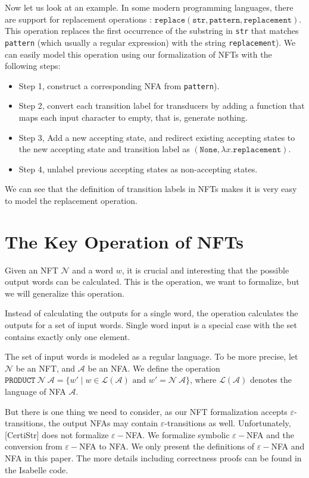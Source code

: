 \documentclass[a4paper,UKenglish,cleveref, autoref, thm-restate]{lipics-v2021}
\begin{document}
Now let us look at an example. In some modern programming languages, there are support for replacement operations : $\texttt{replace}(\texttt{str}, \texttt{pattern}, \texttt{replacement})$. This operation replaces the first occurrence of the substring  in \texttt{str} that matches \texttt{pattern} (which usually a regular expression) with the string \texttt{replacement}). 
We can easily model this operation using our formalization of NFTs with the following steps:
\begin{itemize}
\item Step 1, construct a corresponding NFA from \texttt{pattern}).
\item Step 2, convert each transition label for transducers by adding a function that maps each input character to empty, that is, generate nothing.
\item Step 3, Add a new accepting state, and redirect existing accepting states to the new accepting state and transition label as $(\texttt{None}, \lambda x. \texttt{replacement})$.
\item Step 4, unlabel previous accepting states as non-accepting states. 
\end{itemize}

We can see that the definition of transition labels in NFTs makes it is very easy to model the replacement operation.

\section{The Key Operation of NFTs}
\label{sec-form-fts}

Given an NFT $\mathcal{N}$ and a word $w$, it is crucial and interesting that the possible output words can be calculated. This is the operation, we want to formalize, but we will generalize this operation.

Instead of calculating the outputs for a single word, the operation calculates the outputs for a set of input words. Single word input is a special case with the set contains exactly only one element.

The set of input words is modeled as a regular language. To be more precise, let $\mathcal{N}$ be an NFT, and $\mathcal{A}$ be an NFA. We define the operation $\texttt{PRODUCT} ~\mathcal{N}~\mathcal{A} = \{w'\mid w\in \mathcal{L}(\mathcal{A})\text{ and } w' = \mathcal{N}~\mathcal{A}\}$, where $\mathcal{L}(\mathcal{A})$ denotes the language of NFA $\mathcal{A}$.


But there is one thing we need to consider, as our NFT formalization accepts $\varepsilon$-transitions, the output NFAs may contain $\varepsilon$-transitions as well. Unfortunately, [CertiStr] does not formalize $\varepsilon-$NFA. We formalize symbolic $\varepsilon-$NFA and the conversion from $\varepsilon-$NFA to NFA. We only present the definitions of $\varepsilon-$NFA and NFA in this paper. The more details including correctness proofs can be found in the Isabelle code. 
\end{document}
